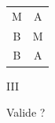 \begin{frame}
	
	\begin{description}[labelindent=6pt,style=multiline,leftmargin=1.3in]
		 \setlength\itemsep{1em}

\item[$1^{\grave{e}re}$ figure] \begin{tabular}{cc}
M & A \\
	B & M \\
\cline{1-2}
		B & A \\
\end{tabular}
\item[Mode] III \pause
\item[Question] Valide ? 

	\end{description} 
\end{frame}



